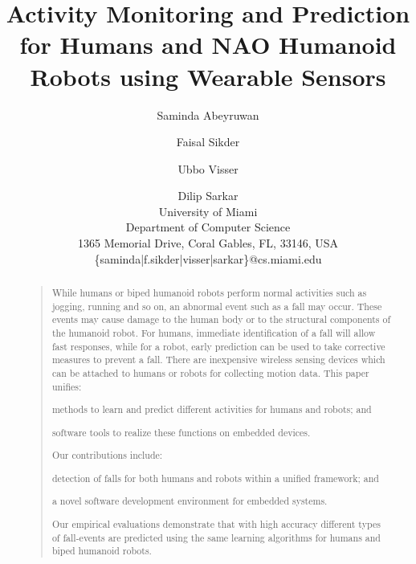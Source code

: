 \documentclass[letterpaper]{article}
\begin{document}
 \begin{sloppy}
%
\title{Activity Monitoring and Prediction for Humans and NAO Humanoid Robots using 
Wearable Sensors}
\author{Saminda Abeyruwan \and Faisal Sikder \and Ubbo Visser \and Dilip Sarkar\\
 University of Miami \\
Department of Computer Science\\
 1365 Memorial Drive, Coral Gables, FL, 33146, USA\\
{\ttfamily \{saminda|f.sikder|visser|sarkar\}@cs.miami.edu}
}
\maketitle
\begin{abstract}
\begin{quote}
While humans or biped humanoid robots perform normal activities such as jogging, running and so 
on, an abnormal event such as a fall may occur. These events may cause damage to the human body or 
to the structural components of the humanoid robot. For humans, immediate identification of a fall 
will allow fast responses, while for a robot, early prediction can be used to take corrective 
measures to prevent a fall. There are inexpensive wireless sensing devices which can be  attached 
to humans or robots for collecting motion data. This paper unifies: \begin{inparaenum}[1)] \item 
methods to learn and predict different activities for humans and robots; and \item software 
tools to realize these functions  on embedded devices. \end{inparaenum} Our contributions include: 
\begin{inparaenum}[1)] \item detection of falls for both humans and robots within a unified 
framework; and \item  a  novel software development environment for embedded systems. 
\end{inparaenum} Our empirical evaluations demonstrate that with high accuracy different types of  
fall-events are predicted using the same learning algorithms for humans and biped humanoid robots. 
\end{quote}
\end{abstract}


\end{sloppy}
\end{document}
